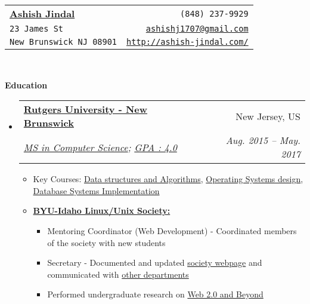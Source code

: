 \documentclass[letterpaper,11pt]{article}
\makeatletter
\newcommand{\resitem}[1]{\item #1 \vspace{-2pt}}
\newcommand{\resheading}[1]{{\large \colorbox{mygrey}{\begin{minipage}{\textwidth}{\textbf{#1 \vphantom{p\^{E}}}}\end{minipage}}}}
\newcommand{\ressubheading}[4]{
\begin{tabular*}{6.5in}{l@{\extracolsep{\fill}}r}
		\textbf{#1} & #2 \\
		\textit{#3} & \textit{#4} \\
\end{tabular*}\vspace{-6pt}}
\makeatother
\begin{document}
\newcommand{\mywebheader}{
\begin{tabular*}{7in}{l@{\extracolsep{\fill}}r}
	\textbf{\href{http://www.ashish-jindal.com/}{\LARGE Ashish Jindal}} & {\footnotesize \texttt{(848) 237-9929}}\\
	{\footnotesize \texttt{23 James St}} & {\footnotesize \texttt{\href{mailto:ashishj1707@gmail.com}{ashishj1707@gmail.com}}}\\
	 {\footnotesize \texttt{New Brunswick NJ 08901}} & {\footnotesize \texttt{\href{http://www.ashish-jindal.com/}{http://ashish-jindal.com/}}} \\
	\end{tabular*}
\\
\vspace{0.1in}}

\mywebheader

\resheading{Education}
	\begin{itemize}
		\item
			\ressubheading{\href{www.rutgers.edu}{Rutgers University - New Brunswick}}{New Jersey, US}{\href{https://www.cs.rutgers.edu/}{MS in Computer Science}; \href{http://www.ashish-jindal.com/unofficial_transcript.pdf}{GPA : 4.0}}{Aug. 2015 -- May. 2017}
				{ \footnotesize
				\begin{itemize}
					\resitem{Key Courses: \href{https://www.cs.rutgers.edu/graduate/courses/512/}{Data structures and Algorithms}, \href{https://www.cs.rutgers.edu/graduate/courses/518/}{Operating Systems design}, \href{https://www.cs.rutgers.edu/graduate/courses/539/}{Database Systems Implementation}}
					\resitem{\textbf{\href{http://www.byui.edu/Societies/Linux/}{BYU-Idaho Linux/Unix Society:}}} 
						\begin{itemize}
							\resitem{Mentoring Coordinator (Web Development) - Coordinated members of the society with new students}
							\resitem{Secretary - Documented and updated \href{http://www.byui.edu/Societies/Linux/default.htm}{society webpage} and communicated with \href{http://www.byui.edu/BusandComm/}{other departments}} 
							\resitem{Performed undergraduate research on \href{http://www.derekhildreth.com/portfolio/Research/Web_2.0_and_Beyond_Report_Column_Format.pdf}{Web 2.0 and Beyond}}
						\end{itemize}
				\end{itemize}
				}
\begin{comment}
		\item
			\ressubheading{\href{http://bcc.billings.k12.mt.us/}{Billings Career Center}}{Billings, MT}{\href{http://www.cisco.com/web/learning/netacad/index.html}{Cisco Networking Academy}; GPA:3.33}{Aug. 2002 - May 2003}
				{ \footnotesize
				\begin{itemize}
				\resitem{Graduated \href{http://www.cisco.com/web/learning/netacad/index.html}{Cisco Semester Four} comprising of coursework in networking infrastructures including LAN and WAN design and implementation}
				\end{itemize}
				}
\end{comment}
	\end{itemize} %
\end{document}
